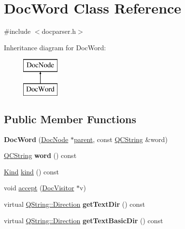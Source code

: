 \hypertarget{class_doc_word}{}\section{Doc\+Word Class Reference}
\label{class_doc_word}


{\ttfamily \#include $<$docparser.\+h$>$}

Inheritance diagram for Doc\+Word\+:\begin{figure}[H]
\begin{center}
\leavevmode
\includegraphics[height=2.000000cm]{class_doc_word}
\end{center}
\end{figure}
\subsection*{Public Member Functions}
\begin{DoxyCompactItemize}
\item 
\mbox{\label{class_doc_word_a73bddea7072aff79b8ea69ce961d5c8f}} 
{\bfseries Doc\+Word} (\mbox{\hyperlink{class_doc_node}{Doc\+Node}} $\ast$\mbox{\hyperlink{class_doc_node_a73e8ad29a91cfceb0968eb00db71a23d}{parent}}, const \mbox{\hyperlink{class_q_c_string}{Q\+C\+String}} \&word)
\item 
\mbox{\label{class_doc_word_af9ecbc2daa4fb051a07c510ab0a7d461}} 
\mbox{\hyperlink{class_q_c_string}{Q\+C\+String}} {\bfseries word} () const
\item 
\mbox{\hyperlink{class_doc_node_aebd16e89ca590d84cbd40543ea5faadb}{Kind}} \mbox{\hyperlink{class_doc_word_a9a2af8f2baad39c39a8b1e958e453351}{kind}} () const
\item 
void \mbox{\hyperlink{class_doc_word_a68a82c3d5879eee5e06214f42667f224}{accept}} (\mbox{\hyperlink{class_doc_visitor}{Doc\+Visitor}} $\ast$v)
\item 
\mbox{\label{class_doc_word_a6341cd12bc0d8d2bfa6d50e2e00338d9}} 
virtual \mbox{\hyperlink{class_q_string_acaff43b133319ea651f19aac6b967406}{Q\+String\+::\+Direction}} {\bfseries get\+Text\+Dir} () const
\item 
\mbox{\label{class_doc_word_ae95aef99552b572e0c7825d4e6885d0d}} 
virtual \mbox{\hyperlink{class_q_string_acaff43b133319ea651f19aac6b967406}{Q\+String\+::\+Direction}} {\bfseries get\+Text\+Basic\+Dir} () const
\end{DoxyCompactItemize}
